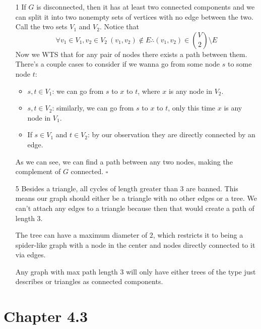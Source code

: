 \documentclass[12pt]{article}
\begin{document}
\begin{enumerate}
      \item[1] If $G$ is disconnected, then it has at least two connected components and
            we can split it into two nonempty sets of vertices with no edge between the two.
            Call the two sets $V_1$ and $V_2$.
            Notice that
            \[\forall v_1 \in V_1, v_2 \in V_2\ (v_1, v_2) \notin E \therefore (v_1, v_2) \in \binom{V}{2} \setminus E\]
            Now we WTS that for any pair of nodes there exists a path between them.
            There's a couple cases to consider if we wanna go from some node $s$ to some node $t$:
            \begin{itemize}
                  \item $s, t \in V_1$: we can go from $s$ to $x$ to $t$, where $x$ is any node in $V_2$.
                  \item $s, t \in V_2$: similarly, we can go from $s$ to $x$ to $t$, only this time $x$ is any node in $V_1$.
                  \item If $s \in V_1$ and $t \in V_2$: by our observation they are directly connected by an edge.
            \end{itemize}
            As we can see, we can find a path between any two nodes, making the complement of $G$ connected. $\square$

      \item[5] Besides a triangle, all cycles of length greater than $3$ are banned.
            This means our graph should either be a triangle with no other edges or a tree.
            We can't attach any edges to a triangle because then that would create a path of length $3$.

            The tree can have a maximum diameter of $2$,
            which restricts it to being a spider-like graph
            with a node in the center and nodes directly connected to it via edges.

            Any graph with max path length $3$ will only have either trees of the
            type just describes or triangles as connected components.
\end{enumerate}

\pagebreak

\section{Chapter 4.3}
\end{document}
